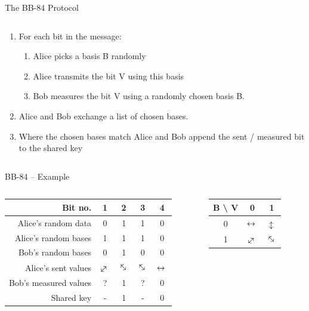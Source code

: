 \documentclass{beamer}
\newcommand{\myarrow}[1][-45]{%
  \mathrel{%
    \text{$
     \begin{tikzpicture}[baseline = -0.5ex]
       \node[inner sep=0pt,outer sep=0pt,rotate = #1] (a) at (0,0)  {$\leftrightarrow{}$};
    \end{tikzpicture}
    $}%
  }%
}%
\begin{document}
	\begin{frame}{The BB-84 Protocol} %
		\begin{columns}
			\begin{column}{\textwidth}
				\begin{enumerate}
					\item For each bit in the message:
						\begin{enumerate}
							\item Alice picks a basis B randomly
							\item Alice transmits the bit V using this basis
							\item Bob measures the bit V using a randomly chosen basis B.
						\end{enumerate}
					\item Alice and Bob exchange a list of chosen bases.
					\item Where the chosen bases match Alice and Bob append the sent / measured bit to the shared key
				\end{enumerate}
			\end{column}
		\end{columns}
	\end{frame}
	
	\begin{frame}{BB-84 – Example} %
		\begin{columns}
			\begin{column}{0.7\textwidth}
				\begin{table}
					\begin{tabular}{r | c | c | c | c  }
						Bit no. & 1 & 2 & 3 & 4 \\
						\hline
						Alice's random data & 0 & 1 & 1 & 0 \\
						Alice's random bases & 1 & 1 & 1 & 0 \\
						Bob's random bases & 0 & 1 & 0 & 0 \\
						\hline
						Alice's sent values & $\myarrow[45]$ & $\myarrow[-45]$ & $\myarrow[-45]$ & $\myarrow[0]$ \\
						Bob's measured values & ? & 1 & ? & 0 \\
						\hline
						Shared key & - & 1 & - & 0 
					\end{tabular}
				\end{table}
			\end{column}
			\vrule{}
			\begin{column}{0.3\textwidth}
				\begin{table}
					\begin{tabular}{c | c  c}
						 B \textbackslash \; V & 0 & 1 \\
						  \hline
						0 & $\myarrow[0]$ & $\myarrow[90]$ \\
						1 & $\myarrow[45]$ & $\myarrow[-45]$ \\
					\end{tabular}
	
				\end{table}

			\end{column}
		\end{columns}
	\end{frame}
	
\end{document}
